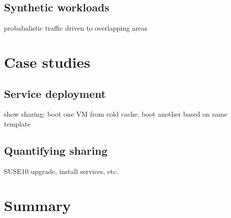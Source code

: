 \subsection{Synthetic workloads}

probabalistic traffic driven to overlapping areas

\section{Case studies}

\subsection{Service deployment}
show sharing: boot one VM from cold cache, boot another based on same template

\subsection{Quantifying sharing}

SUSE10 upgrade, install services, etc.

\section{Summary}